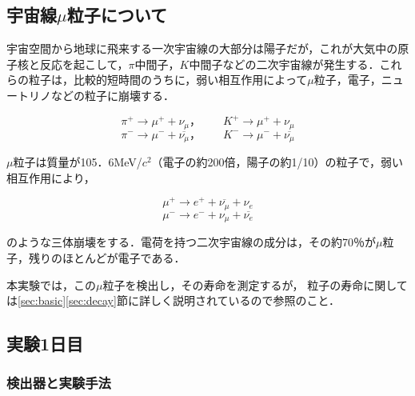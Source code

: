 \documentclass[a4j,10pt,oneside,openany]{jsbook}
\begin{document}
{\subsection{宇宙線$\mu$粒子について}
宇宙空間から地球に飛来する一次宇宙線の大部分は陽子だが，これが大気中の原子核と反応を起こして，$\pi$中間子，$K$中間子などの二次宇宙線が発生する．これらの粒子は，比較的短時間のうちに，弱い相互作用によって$\mu$粒子，電子，ニュートリノなどの粒子に崩壊する．
\begin{center}
  \begin{equation}
    \pi^+ \to \mu^+ + \nu_\mu， \hspace{2em} K^+ \to \mu^+ + \nu_\mu　
  \end{equation}
  \begin{equation}
    \pi^- \to \mu^- + \overline{\nu_\mu}， \hspace{2em} K^- \to  \mu^- + \overline{\nu_\mu}
  \end{equation}
\end{center}

$\mu$粒子は質量が105．6MeV/$c^2$（電子の約200倍，陽子の約1/10）の粒子で，弱い相互作用により，
\begin{center}
  \begin{equation}
    \mu^+ \to e^+  +  \overline{\nu_\mu}  +  \nu_e
  \end{equation}
  \begin{equation}
    \mu^-  \to  e^-  +  \nu_\mu  +  \overline{\nu_e}
  \end{equation}
\end{center}
のような三体崩壊をする．電荷を持つ二次宇宙線の成分は，その約70％が$\mu$粒子，残りのほとんどが電子である．

本実験では，この$\mu$粒子を検出し，その寿命を測定するが，
粒子の寿命に関しては\ref{sec:basic}\ref{sec:decay}節に詳しく説明されているので参照のこと．


\subsection{実験1日目}

\subsubsection{検出器と実験手法}

}
\end{document}
